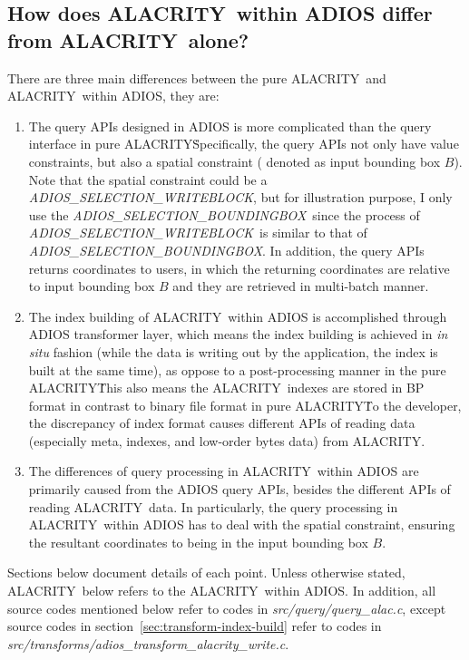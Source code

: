 \documentclass[11pt,a4paper]{article}
\newcommand{\adiossw}{\emph{ADIOS\_SELECTION\_WRITEBLOCK}}
\newcommand{\adiossb}{\emph{ADIOS\_SELECTION\_BOUNDINGBOX}}
\newcommand{\alac}{ALACRITY}
\begin{document}
\subsection{How does \alac\ within ADIOS differ from \alac\ alone?}
There are three main differences between the pure \alac\ and \alac\ within ADIOS, they are: 
\begin{enumerate}
\item The query APIs designed in ADIOS is more complicated than the query interface in pure \alac\. 
Specifically, the query APIs not only have value constraints, but also a spatial constraint ( denoted as input bounding box $B$). 
Note that the spatial constraint could be a \adiossw, but for illustration purpose, I only use the \adiossb\ since the process of \adiossw\ is similar to that of \adiossb.
In addition, the query APIs returns coordinates to users, in which the returning coordinates are relative to input bounding box $B$ and they are retrieved in multi-batch manner. 

\item The index building of \alac\ within ADIOS is accomplished through ADIOS transformer layer, which means the index building is achieved in \emph{in situ} fashion (while the data is writing out by the application, the index is built at the same time), as oppose to a post-processing manner in the pure \alac\. 
This also means the \alac\ indexes are stored in BP format in contrast to binary file format in pure \alac\. 
To the developer, the discrepancy of index format causes different APIs of reading data (especially meta, indexes, and low-order bytes data) from \alac.


\item The differences of query processing in \alac\ within ADIOS are primarily caused from the ADIOS query APIs, besides the different APIs of reading \alac\ data. 
In particularly, the query processing in \alac\ within ADIOS has to deal with the spatial constraint, ensuring the resultant coordinates to being in the input bounding box $B$. 

 
\end{enumerate}

Sections below document details of each point.  Unless otherwise stated, \alac\ below refers to the \alac\ within ADIOS. 
In addition,  all source codes mentioned below refer to codes in \emph{src\//query\//query\_alac.c}, except source codes in section~\ref{sec:transform-index-build} refer to codes in \emph{src\//transforms\//adios\_transform\_alacrity\_write.c}.
\end{document}
